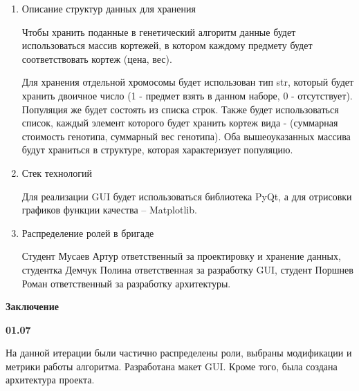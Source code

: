 \documentclass{article}
\begin{document}
\begin{enumerate}
\item Описание структур данных для хранения

Чтобы хранить поданные в генетический алгоритм данные будет использоваться массив кортежей, в котором каждому предмету будет соответствовать кортеж (цена, вес).

Для хранения отдельной хромосомы будет использован тип str, который будет хранить двоичное число (1 - предмет взять в данном наборе, 0 - отсутствует). Популяция же будет состоять из списка строк. Также будет использоваться список, каждый элемент которого будет хранить кортеж вида - (суммарная стоимость генотипа, суммарный вес генотипа). Оба вышеоуказанных массива будут храниться в структуре, которая характеризует популяцию. 

\item Стек технологий

Для реализации GUI будет использоваться библиотека PyQt, а для отрисовки графиков функции качества -- Matplotlib.

\item Распределение ролей в бригаде

Студент Мусаев Артур ответственный за проектировку и хранение данных, студентка Демчук Полина ответственная за разработку GUI, студент Поршнев Роман ответственный за разработку архитектуры.

\end{enumerate}

\newpage

\textbf{Заключение}

\textbf{01.07}

На данной итерации были частично распределены роли, выбраны модификации и метрики работы алгоритма. Разработана макет GUI. Кроме того, была создана архитектура проекта.
\end{document}

